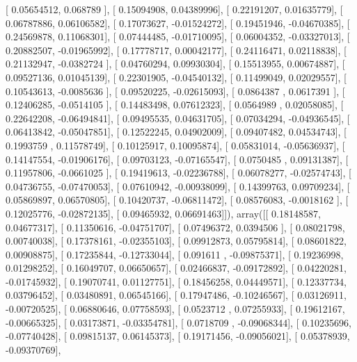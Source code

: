 \documentclass{article}
\begin{document}
       [ 0.05654512,  0.068789  ],
       [ 0.15094908,  0.04389996],
       [ 0.22191207,  0.01635779],
       [ 0.06787886,  0.06106582],
       [ 0.17073627, -0.01524272],
       [ 0.19451946, -0.04670385],
       [ 0.24569878,  0.11068301],
       [ 0.07444485, -0.01710095],
       [ 0.06004352, -0.03327013],
       [ 0.20882507, -0.01965992],
       [ 0.17778717,  0.00042177],
       [ 0.24116471,  0.02118838],
       [ 0.21132947, -0.0382724 ],
       [ 0.04760294,  0.09930304],
       [ 0.15513955,  0.00674887],
       [ 0.09527136,  0.01045139],
       [ 0.22301905, -0.04540132],
       [ 0.11499049,  0.02029557],
       [ 0.10543613, -0.0085636 ],
       [ 0.09520225, -0.02615093],
       [ 0.0864387 ,  0.0617391 ],
       [ 0.12406285, -0.0514105 ],
       [ 0.14483498,  0.07612323],
       [ 0.0564989 ,  0.02058085],
       [ 0.22642208, -0.06494841],
       [ 0.09495535,  0.04631705],
       [ 0.07034294, -0.04936545],
       [ 0.06413842, -0.05047851],
       [ 0.12522245,  0.04902009],
       [ 0.09407482,  0.04534743],
       [ 0.1993759 ,  0.11578749],
       [ 0.10125917,  0.10095874],
       [ 0.05831014, -0.05636937],
       [ 0.14147554, -0.01906176],
       [ 0.09703123, -0.07165547],
       [ 0.0750485 ,  0.09131387],
       [ 0.11957806, -0.0661025 ],
       [ 0.19419613, -0.02236788],
       [ 0.06078277, -0.02574743],
       [ 0.04736755, -0.07470053],
       [ 0.07610942, -0.00938099],
       [ 0.14399763,  0.09709234],
       [ 0.05869897,  0.06570805],
       [ 0.10420737, -0.06811472],
       [ 0.08576083, -0.0018162 ],
       [ 0.12025776, -0.02872135],
       [ 0.09465932,  0.06691463]]), array([[ 0.18148587,  0.04677317],
       [ 0.11350616, -0.04751707],
       [ 0.07496372,  0.0394506 ],
       [ 0.08021798,  0.00740038],
       [ 0.17378161, -0.02355103],
       [ 0.09912873,  0.05795814],
       [ 0.08601822,  0.00908875],
       [ 0.17235844, -0.12733044],
       [ 0.091611  , -0.09875371],
       [ 0.19236998,  0.01298252],
       [ 0.16049707,  0.06650657],
       [ 0.02466837, -0.09172892],
       [ 0.04220281, -0.01745932],
       [ 0.19070741,  0.01127751],
       [ 0.18456258,  0.04449571],
       [ 0.12337734,  0.03796452],
       [ 0.03480891,  0.06545166],
       [ 0.17947486, -0.10246567],
       [ 0.03126911, -0.00720525],
       [ 0.06880646,  0.07758593],
       [ 0.0523712 ,  0.07255933],
       [ 0.19612167, -0.00665325],
       [ 0.03173871, -0.03354781],
       [ 0.0718709 , -0.09068344],
       [ 0.10235696, -0.07740428],
       [ 0.09815137,  0.06145373],
       [ 0.19171456, -0.09056021],
       [ 0.05378939, -0.09370769],
\end{document}
